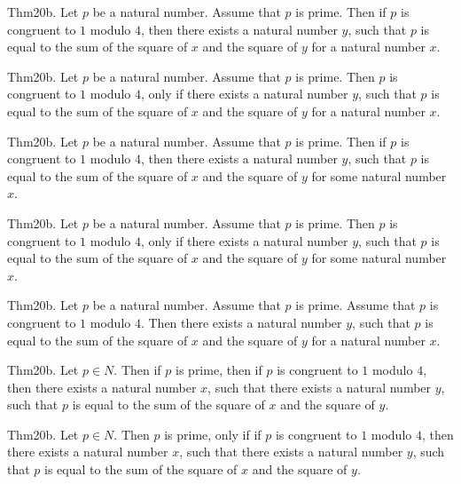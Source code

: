 \documentclass{article}
\begin{document}
Thm20b. Let $p$ be a natural number. Assume that $p$ is prime. Then if $p$ is congruent to $1$ modulo $4$, then there exists a natural number $y$, such that $p$ is equal to the sum of the square of $x$ and the square of $y$ for a natural number $x$.

Thm20b. Let $p$ be a natural number. Assume that $p$ is prime. Then $p$ is congruent to $1$ modulo $4$, only if there exists a natural number $y$, such that $p$ is equal to the sum of the square of $x$ and the square of $y$ for a natural number $x$.

Thm20b. Let $p$ be a natural number. Assume that $p$ is prime. Then if $p$ is congruent to $1$ modulo $4$, then there exists a natural number $y$, such that $p$ is equal to the sum of the square of $x$ and the square of $y$ for some natural number $x$.

Thm20b. Let $p$ be a natural number. Assume that $p$ is prime. Then $p$ is congruent to $1$ modulo $4$, only if there exists a natural number $y$, such that $p$ is equal to the sum of the square of $x$ and the square of $y$ for some natural number $x$.

Thm20b. Let $p$ be a natural number. Assume that $p$ is prime. Assume that $p$ is congruent to $1$ modulo $4$. Then there exists a natural number $y$, such that $p$ is equal to the sum of the square of $x$ and the square of $y$ for a natural number $x$.

Thm20b. Let $p \in N$. Then if $p$ is prime, then if $p$ is congruent to $1$ modulo $4$, then there exists a natural number $x$, such that there exists a natural number $y$, such that $p$ is equal to the sum of the square of $x$ and the square of $y$.

Thm20b. Let $p \in N$. Then $p$ is prime, only if if $p$ is congruent to $1$ modulo $4$, then there exists a natural number $x$, such that there exists a natural number $y$, such that $p$ is equal to the sum of the square of $x$ and the square of $y$.
\end{document}
